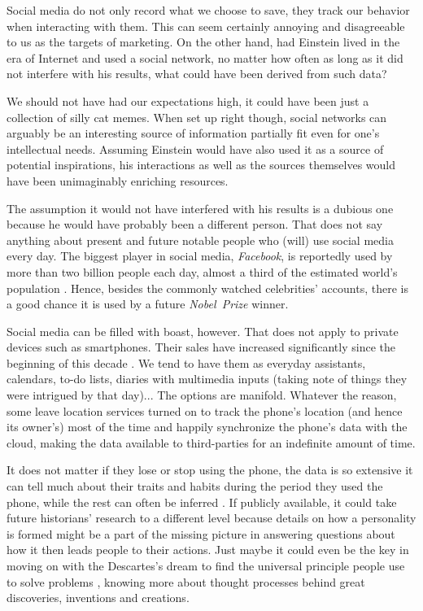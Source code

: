 \documentclass[a4paper]{article}
\begin{document}
Social media do not only record what we choose to save, they track our behavior when interacting with them. This can seem certainly annoying and disagreeable to us as the targets of marketing.
On the other hand, had Einstein lived in the era of Internet and used a social network, no matter how often as long as it did not interfere with his results, what could have been derived from such data?

We should not have had our expectations high, it could have been just a collection of silly cat memes. When set up right though, social networks can arguably be an interesting source of information partially fit even for one's intellectual needs. Assuming Einstein would have also used it as a source of potential inspirations, his interactions as well as the sources themselves would have been unimaginably enriching resources.

The assumption it would not have interfered with his results is a dubious one because he would have probably been a different person. That does not say anything about present and future notable people who (will) use social media every day.
The biggest player in social media, \textit{Facebook}, is reportedly used by more than two billion people each day, almost a third of the estimated world's population \cite{facebook, wp}. Hence, besides the commonly watched celebrities' accounts, there is a good chance it is used by a future \emph{Nobel~Prize} winner.

Social media can be filled with boast, however. That does not apply to private devices such as smartphones. Their sales have increased significantly since the beginning of this decade \cite{statista2}. We tend to have them as everyday assistants, calendars, to-do lists, diaries with multimedia inputs (taking note of things they were intrigued by that day)...  The options are manifold.
Whatever the reason, some leave location services turned on to track the phone's location (and hence its owner's) most of the time and happily synchronize the phone's data with the cloud, making the data  available to third-parties for an indefinite amount of time.

It does not matter if they lose or stop using the phone, the data is so extensive it can tell much about their traits and habits during the period they used the phone, while the rest can often be inferred \cite{quattrone}. If publicly available, it could take future historians' research to a different level because details on how a personality is formed might be a part of the missing picture in answering questions about how it then leads people to their actions.
Just maybe it could even be the key in moving on with the Descartes's dream to find the universal principle people use to solve problems \cite{polya}, knowing more about thought processes behind great discoveries, inventions and creations.
\end{document}
